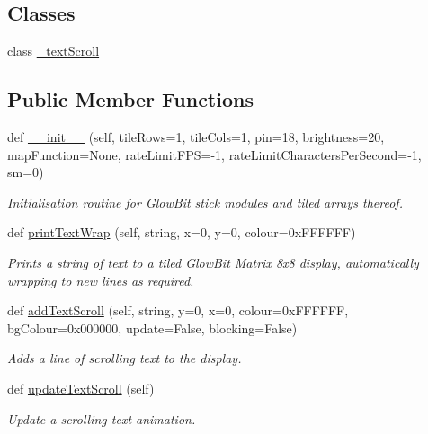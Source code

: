 \subsection*{Classes}
\begin{DoxyCompactItemize}
\item 
class \hyperlink{classglowbit_1_1matrix8x8_1_1__textScroll}{\+\_\+text\+Scroll}
\end{DoxyCompactItemize}
\subsection*{Public Member Functions}
\begin{DoxyCompactItemize}
\item 
def \hyperlink{classglowbit_1_1matrix8x8_a7b30f3aec73c8a938a063ea640899af6}{\+\_\+\+\_\+init\+\_\+\+\_\+} (self, tile\+Rows=1, tile\+Cols=1, pin=18, brightness=20, map\+Function=None, rate\+Limit\+F\+PS=-\/1, rate\+Limit\+Characters\+Per\+Second=-\/1, sm=0)
\begin{DoxyCompactList}\small\item\em Initialisation routine for Glow\+Bit stick modules and tiled arrays thereof. \end{DoxyCompactList}\item 
def \hyperlink{classglowbit_1_1matrix8x8_a1db0574d73977d46ba90068b9970777f}{print\+Text\+Wrap} (self, string, x=0, y=0, colour=0x\+F\+F\+F\+F\+F\+F)
\begin{DoxyCompactList}\small\item\em Prints a string of text to a tiled Glow\+Bit Matrix 8x8 display, automatically wrapping to new lines as required. \end{DoxyCompactList}\item 
def \hyperlink{classglowbit_1_1matrix8x8_ade5b8578e6c38d86f356cdb6997cc314}{add\+Text\+Scroll} (self, string, y=0, x=0, colour=0x\+F\+F\+F\+F\+F\+F, bg\+Colour=0x000000, update=\+False, blocking=\+False)
\begin{DoxyCompactList}\small\item\em Adds a line of scrolling text to the display. \end{DoxyCompactList}\item 
def \hyperlink{classglowbit_1_1matrix8x8_a4a529f9b42ea95cc0f5dafcb0085d096}{update\+Text\+Scroll} (self)
\begin{DoxyCompactList}\small\item\em Update a scrolling text animation. \end{DoxyCompactList}\item 

\end{DoxyCompactItemize}
